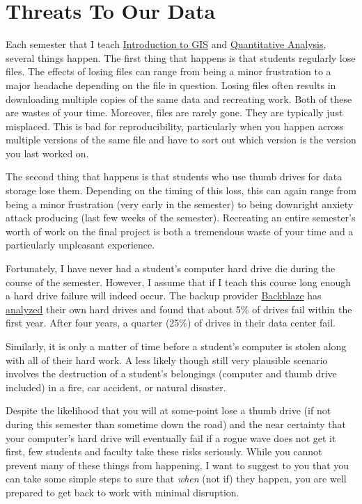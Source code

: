 \documentclass[]{book}
\theoremstyle{definition}
\theoremstyle{definition}
\theoremstyle{definition}
\theoremstyle{remark}
\begin{document}
\section{Threats To Our Data}\label{threats-to-our-data}

Each semester that I teach
\href{https://slu-soc5650.github.io}{Introduction to GIS} and
\href{https://slu-soc5050.github.io}{Quantitative Analysis}, several
things happen. The first thing that happens is that students regularly
lose files. The effects of losing files can range from being a minor
frustration to a major headache depending on the file in question.
Losing files often results in downloading multiple copies of the same
data and recreating work. Both of these are wastes of your time.
Moreover, files are rarely gone. They are typically just misplaced. This
is bad for reproducibility, particularly when you happen across multiple
versions of the same file and have to sort out which version is the
version you last worked on.

The second thing that happens is that students who use thumb drives for
data storage lose them. Depending on the timing of this loss, this can
again range from being a minor frustration (very early in the semester)
to being downright anxiety attack producing (last few weeks of the
semester). Recreating an entire semester's worth of work on the final
project is both a tremendous waste of your time and a particularly
unpleasant experience.

Fortunately, I have never had a student's computer hard drive die during
the course of the semester. However, I assume that if I teach this
course long enough a hard drive failure will indeed occur. The backup
provider \href{https://www.backblaze.com/}{Backblaze} has
\href{https://www.backblaze.com/blog/how-long-do-disk-drives-last/}{analyzed}
their own hard drives and found that about 5\% of drives fail within the
first year. After four years, a quarter (25\%) of drives in their data
center fail.

Similarly, it is only a matter of time before a student's computer is
stolen along with all of their hard work. A less likely though still
very plausible scenario involves the destruction of a student's
belongings (computer and thumb drive included) in a fire, car accident,
or natural disaster.

Despite the likelihood that you will at some-point lose a thumb drive
(if not during this semester than sometime down the road) and the near
certainty that your computer's hard drive will eventually fail if a
rogue wave does not get it first, few students and faculty take these
risks seriously. While you cannot prevent many of these things from
happening, I want to suggest to you that you can take some simple steps
to sure that \emph{when} (not if) they happen, you are well prepared to
get back to work with minimal disruption.
\end{document}
